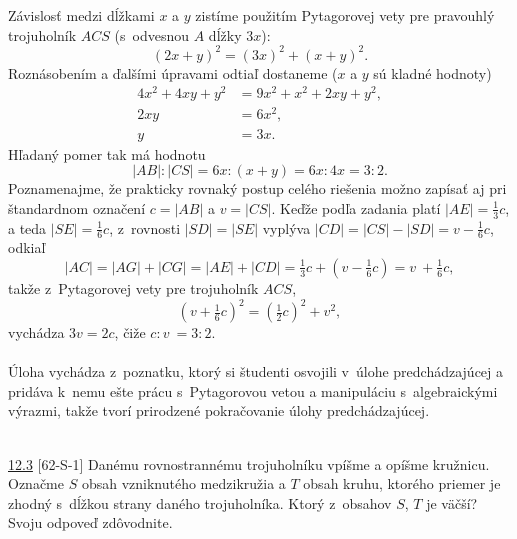 Závislosť medzi dĺžkami $x$ a $y$ zistíme použitím Pytagorovej vety pre pravouhlý trojuholník $ACS$ (s~odvesnou $A$ dĺžky $3x$):
$$(2x + y)^2= (3x)^2+ (x + y)^2.$$
Roznásobením a ďalšími úpravami odtiaľ dostaneme ($x$ a $y$ sú kladné hodnoty)
\begin{align*}
4x^2+ 4xy + y^2 &= 9x^2+ x^2+ 2xy + y^2,\\
2xy & = 6x^2,\\
y &= 3x.
\end{align*}
Hľadaný pomer tak má hodnotu
$$|AB| : |CS| = 6x : (x + y) = 6x : 4x = 3 : 2.$$
Poznamenajme, že prakticky rovnaký postup celého riešenia možno zapísať aj pri štandardnom označení $c = |AB|$ a $v = |CS|$. Keďže podľa zadania platí $|AE| =\frac{1}{3}c$, a teda $|SE| =\frac{1}{6}c$, z~rovnosti $|SD| = |SE|$ vyplýva $|CD| = |CS|-|SD| = v-\frac{1}{6}c$, odkiaľ
$$|AC| = |AG| + |CG| = |AE| + |CD| =\tfrac{1}{3}c + (v-\tfrac{1}{6}c) = v~+\tfrac{1}{6}c,$$
takže z~Pytagorovej vety pre trojuholník $ACS$,
$$(v +\tfrac{1}{6}c)^2= (\tfrac{1}{2}c)^2+ v^2,$$
vychádza $3v = 2c$, čiže $c : v~= 3 : 2$.\\
\\
\kom Úloha vychádza z~poznatku, ktorý si študenti osvojili v~úlohe predchádzajúcej a pridáva k~nemu ešte prácu s~Pytagorovou vetou a manipuláciu s~algebraickými výrazmi, takže tvorí prirodzené pokračovanie úlohy predchádzajúcej.\\
\\
\begin{tcolorbox}[breakable,notitle,boxrule=0pt,colback=light-gray,colframe=light-gray]\ul{12.3} [62-S-1] Danému rovnostrannému trojuholníku vpíšme a opíšme kružnicu. Označme $S$ obsah vzniknutého medzikružia a $T$ obsah kruhu, ktorého priemer je zhodný s~dĺžkou strany daného trojuholníka. Ktorý z~obsahov $S$, $T$ je väčší? Svoju odpoveď zdôvodnite.

\end{tcolorbox}


